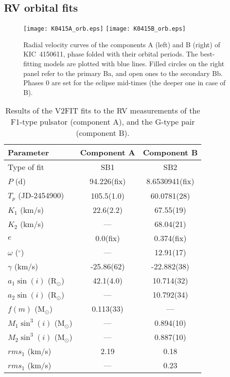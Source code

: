 \documentclass{aa}
\begin{document}
\subsection{RV orbital fits}

\begin{figure*}
\centering
\texttt{[image: K0415A\_orb.eps]}
\texttt{[image: K0415B\_orb.eps]}
\caption{Radial velocity curves of the components A (left) and B (right) of KIC~4150611, 
phase folded with their orbital periods. The best-fitting models are plotted with 
blue lines. Filled circles on the right panel refer to the primary Ba, 
and open ones to the secondary Bb. Phases 0 are set for the eclipse mid-times
(the deeper one in case of B).
}\label{fig_rv_0415}
\end{figure*}
 
\begin{table}
\centering
\caption{Results of the V2FIT fits to the RV measurements of the
F1-type pulsator (component A), and the G-type pair (component B).}\label{tab_par_sb2}
\begin{tabular}{lcc}
\hline \hline
Parameter	& Component A & Component B \\
\hline
Type of fit		& SB1		& SB2	\\
$P$ (d)			& 94.226(fix)	& 8.6530941(fix)	\\
$T_p$ (JD-2454900)	& 105.5(1.0)	& 60.0781(28)	\\
$K_1$ (km/s)		& 22.6(2.2)	& 67.55(19)	\\
$K_2$ (km/s)		&    ---	& 68.04(21)	\\
$e$ 			& 0.0(fix)	& 0.374(fix)	\\
$\omega$ ($^\circ$)	&    ---	& 12.91(17)	\\
$\gamma$ (km/s)	& -25.86(62)	& -22.882(38)	\\
$a_1\sin(i)$ (R$_\odot$)& 42.1(4.0)	& 10.714(32)	\\
$a_2\sin(i)$ (R$_\odot$)& ---		& 10.792(34)	\\
$f(m)$ (M$_\odot$)	& 0.113(33)	&  --- \\
$M_1\sin^3(i)$ (M$_\odot$)	&  --- 	& 0.894(10)	\\
$M_2\sin^3(i)$ (M$_\odot$)	&  --- 	& 0.887(10)	\\
$rms_1$ (km/s)		& 2.19		& 0.18	\\
$rms_1$ (km/s)		& ---		& 0.23	\\
\hline
\end{tabular}
\end{table}
\end{document}
